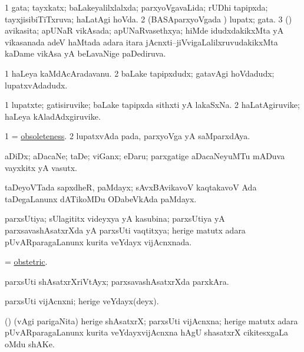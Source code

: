 \bentry
{}
\gl{\gu}
\bmng
\bnum
\num{1} gata; tayxkatx; baLakeyalilxlalxda; parxyoVgavaLida; rUDhi tapipxda; tayxjisibiTiTxruva; haLatAgi hoVda. 
\num{2} (BASAparxyoVgada \vi) lupatx; gata. 
\num{3} (\jiVvi) avikasita; apUNaR vikAsada; apUNaRvasethxya; hiMde idudxdakikxMta yA vikasanada adeV haMtada adara itara jAcnxti--jiVvigaLalilxruvudakikxMta kaDame vikAsa yA beLavaNige paDediruva. 
\enum
\emng
\eentry

\bentry
{}
\gl{\nA}
\bmng
\bnum
\num{1} haLeya kaMdAcAradavanu. 
\num{2} baLake tapipxdudx; gatavAgi hoVdadudx; lupatxvAdadudx. 
\enum
\emng
\eentry

\bentry
{}
\gl{\nA}
\bmng
\bnum
\num{1} lupatxte; gatisiruvike; baLake tapipxda sithxti yA lakaSxNa. 
\num{2} haLatAgiruvike; haLeya kAladAdxgiruvike. 
\enum
\emng
\eentry

\bentry
{}
\gl{\nA}
\bmng
\bnum
\num{1} = \hyperlink{obsoleteness}{obsoleteness}. 
\num{2} lupatxvAda pada, parxyoVga yA saMparxdAya. 
\enum
\emng
\eentry

\bentry
{}
\gl{\nA}
\bmng
aDiDx; aDacaNe; taDe; viGanx; eDaru; parxgatige aDacaNeyuMTu mADuva vayxkitx yA vasutx. 
\emng
\eentry

\bentry
{}
\gl{\nA}
\bmng
taDeyoVTada sapxdheR, paMdayx; sAvxBAvikavoV kaqtakavoV Ada taDegaLanunx dATikoMDu ODabeVkAda paMdayx. 
\emng
\eentry

\bentry
{}
\gl{\gu}
\bmng
parxsUtiya; sUlagititx videyxya yA kasubina; parxsUtiya yA parxsavashAsatxrXda yA parxsUti vaqtitxya; herige matutx adara pUvARparagaLanunx kurita veYdayx vijAcnxnada. 
\emng
\eentry

\bentry
{}
\gl{\gu}
\bmng
= \hyperlink{obstetric}{obstetric}. 
\emng
\eentry

\bentry
{}
\gl{\kirxvi}
\bmng
parxsUti shAsatxrXriVtAyx; parxsavashAsatxrXda parxkAra. 
\emng
\eentry

\bentry
{}
\gl{\nA}
\bmng
parxsUti vijAcnxni; herige veYdayx(deyx). 
\emng
\eentry

\bentry
{}
\gl{\nA}
\bmng
(\bava) (\Eva vAgi parigaNita) herige shAsatxrX; parxsUti vijAcnxna; herige matutx adara pUvARparagaLanunx kurita veYdayxvijAcnxna hAgU shasatxrX cikitesxgaLa oMdu shAKe. 
\emng
\eentry


